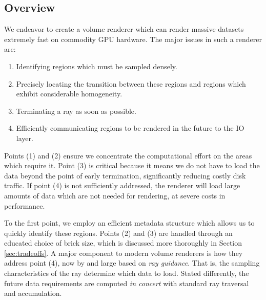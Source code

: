 \subsection{Overview}

We endeavor to create a volume renderer which can render massive 
datasets extremely fast on commodity GPU hardware.  The major issues in
such a renderer are:
\begin{enumerate}
  \itemsep0em
  \item Identifying regions which must be sampled densely.

  \item Precisely locating the transition between these regions and
  regions which exhibit considerable homogeneity.

  \item Terminating a ray as soon as possible.

  \item Efficiently communicating regions to be rendered in the future
  to the IO layer.

\end{enumerate}

Points (1) and (2) ensure we concentrate the computational effort on
the areas which require it.  Point (3) is critical because it means we
do not have to load the data beyond the point of early termination,
significantly reducing costly disk traffic.  If point (4) is not
sufficiently addressed, the renderer will load large amounts of data
which are not needed for rendering, at severe costs in performance.


To the first point, we employ an efficient metadata structure which
allows us to quickly identify these regions.  Points (2) and (3) are
handled through an educated choice of brick size, which is discussed
more thoroughly in Section \ref{sec:tradeoffs}.  A major component to
modern volume renderers is how they address point (4), now by and large
based on \emph{ray guidance}.  That is, the sampling characteristics of
the ray determine which data to load.  Stated differently, the future
data requirements are computed \emph{in concert} with standard ray
traversal and accumulation.



